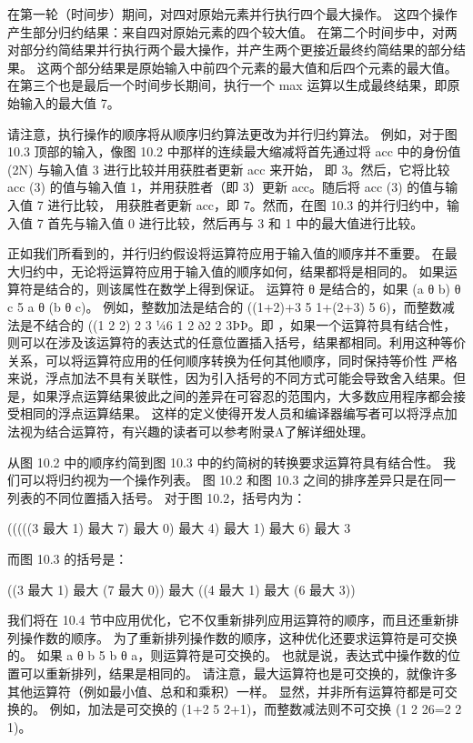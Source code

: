 在第一轮（时间步）期间，对四对原始元素并行执行四个最大操作。 这四个操作产生部分归约结果：来自四对原始元素的四个较大值。 在第二个时间步中，对两对部分约简结果并行执行两个最大操作，并产生两个更接近最终约简结果的部分结果。 这两个部分结果是原始输入中前四个元素的最大值和后四个元素的最大值。 在第三个也是最后一个时间步长期间，执行一个 max 运算以生成最终结果，即原始输入的最大值 7。

请注意，执行操作的顺序将从顺序归约算法更改为并行归约算法。 例如，对于图 10.3 顶部的输入，像图 10.2 中那样的连续最大缩减将首先通过将 acc 中的身份值 (2N) 与输入值 3 进行比较并用获胜者更新 acc 来开始， 即 3。然后，它将比较 acc (3) 的值与输入值 1，并用获胜者（即 3）更新 acc。随后将 acc (3) 的值与输入值 7 进行比较， 用获胜者更新 acc，即 7。然而，在图 10.3 的并行归约中，输入值 7 首先与输入值 0 进行比较，然后再与 3 和 1 中的最大值进行比较。

正如我们所看到的，并行归约假设将运算符应用于输入值的顺序并不重要。 在最大归约中，无论将运算符应用于输入值的顺序如何，结果都将是相同的。 如果运算符是结合的，则该属性在数学上得到保证。 运算符 θ 是结合的，如果 (a θ b) θ c 5 a θ (b θ c)。 例如，整数加法是结合的 ((1+2)+3 5 1+(2+3) 5 6)，而整数减法是不结合的 ((1 2 2) 2 3 ¼6 1 2 ð2 2 3ÞÞ。即 ，如果一个运算符具有结合性，则可以在涉及该运算符的表达式的任意位置插入括号，结果都相同。利用这种等价关系，可以将运算符应用的任何顺序转换为任何其他顺序，同时保持等价性 严格来说，浮点加法不具有关联性，因为引入括号的不同方式可能会导致舍入结果。但是，如果浮点运算结果彼此之间的差异在可容忍的范围内，大多数应用程序都会接受相同的浮点运算结果。 这样的定义使得开发人员和编译器编写者可以将浮点加法视为结合运算符，有兴趣的读者可以参考附录A了解详细处理。

从图 10.2 中的顺序约简到图 10.3 中的约简树的转换要求运算符具有结合性。 我们可以将归约视为一个操作列表。 图 10.2 和图 10.3 之间的排序差异只是在同一列表的不同位置插入括号。 对于图 10.2，括号内为：

(((((3 最大 1) 最大 7) 最大 0) 最大 4) 最大 1) 最大 6) 最大 3

而图 10.3 的括号是：

((3 最大 1) 最大 (7 最大 0)) 最大 ((4 最大 1) 最大 (6 最大 3))

我们将在 10.4 节中应用优化，它不仅重新排列应用运算符的顺序，而且还重新排列操作数的顺序。 为了重新排列操作数的顺序，这种优化还要求运算符是可交换的。 如果 a θ b 5 b θ a，则运算符是可交换的。 也就是说，表达式中操作数的位置可以重新排列，结果是相同的。 请注意，最大运算符也是可交换的，就像许多其他运算符（例如最小值、总和和乘积）一样。 显然，并非所有运算符都是可交换的。 例如，加法是可交换的 (1+2 5 2+1)，而整数减法则不可交换 (1 2 26=2 2 1)。

